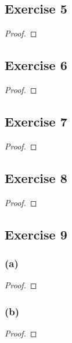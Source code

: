 \documentclass[14pt]{extarticle}
\begin{document}
\subsection{Exercise 5}

\begin{proof}

\end{proof}

\subsection{Exercise 6}

\begin{proof}

\end{proof}

\subsection{Exercise 7}

\begin{proof}

\end{proof}

\subsection{Exercise 8}

\begin{proof}

\end{proof}

\subsection{Exercise 9}

\subsubsection{(a)}

\begin{proof}

\end{proof}

\subsubsection{(b)}

\begin{proof}

\end{proof}
\end{document}
